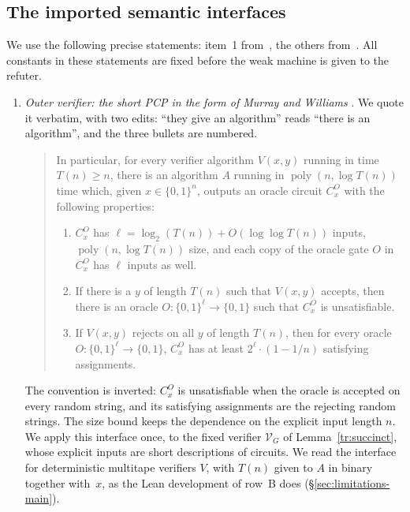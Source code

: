 \documentclass[11pt,letterpaper]{article}
\theoremstyle{definition}
\theoremstyle{remark}
\begin{document}
\subsection{The imported semantic interfaces}
\label{tr:imports}

We use the following precise statements: item~1 from~\cite{MW20}, the
others from~\cite{CLW}.
All constants in these statements are fixed before the weak machine is
given to the refuter.

\begin{enumerate}
\item \emph{Outer verifier: the short PCP in the form of Murray and
Williams} \cite[Section~5, in the proof of Theorem~1.4,
pp.~STOC18-316--STOC18-317]{MW20}. We quote it verbatim, with two
edits: ``they give an algorithm'' reads ``there is an algorithm'', and
the three bullets are numbered.

\begin{quote}
In particular, for every verifier algorithm $V(x,y)$ running in time
$T(n)\ge n$, there is an algorithm $A$
running in $\operatorname{poly}(n,\log T(n))$ time which, given
$x\in\{0,1\}^n$, outputs an oracle circuit $C^O_x$ with the following
properties:
\begin{enumerate}[label=(\roman*)]
\item $C^O_x$ has $\ell=\log_2(T(n))+O(\log\log T(n))$ inputs,
$\operatorname{poly}(n,\log T(n))$ size, and each copy of the oracle
gate $O$ in $C^O_x$ has $\ell$ inputs as well.
\item If there is a $y$ of length $T(n)$ such that $V(x,y)$ accepts,
then there is an oracle $O:\{0,1\}^\ell\to\{0,1\}$ such that $C^O_x$ is
unsatisfiable.
\item If $V(x,y)$ rejects on all $y$ of length $T(n)$, then for every
oracle $O:\{0,1\}^\ell\to\{0,1\}$, $C^O_x$ has at least
$2^\ell\cdot(1-1/n)$ satisfying assignments.
\end{enumerate}
\end{quote}
The convention is inverted: $C^O_x$ is unsatisfiable when the oracle is
accepted on every random string, and its satisfying assignments are the
rejecting random strings. The size bound keeps the dependence on the
explicit input length $n$. We apply this interface once, to the fixed
verifier $\mathcal V_G$ of Lemma~\ref{tr:succinct}, whose explicit inputs are
short descriptions of circuits. We read the interface for
deterministic multitape verifiers $V$, with $T(n)$ given to $A$ in
binary together with~$x$, as the Lean development of row~B does
(\S\ref{sec:limitations-main}).


\end{enumerate}
\end{document}
